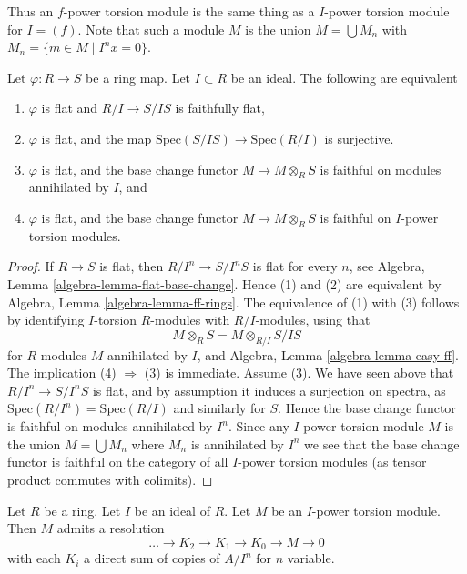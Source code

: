 \noindent
Thus an $f$-power torsion module is the same thing as a $I$-power torsion
module for $I = (f)$. Note that such a module $M$ is the union
$M = \bigcup M_n$ with $M_n = \{m \in M \mid I^nx = 0\}$.

\begin{lemma}
\label{lemma-characterize-flatness-on-torsion}
Let $\varphi : R \to S$ be a ring map. Let $I \subset R$ be an ideal.
The following are equivalent
\begin{enumerate}
\item $\varphi$ is flat and $R/I \to S/IS$ is faithfully flat,
\item $\varphi$ is flat, and the map
$\text{Spec}(S/IS) \to \text{Spec}(R/I)$ is surjective.
\item $\varphi$ is flat, and the base change functor
$M \mapsto M \otimes_R S$ is faithful on modules annihilated by $I$, and
\item $\varphi$ is flat, and the base change functor
$M \mapsto M \otimes_R S$ is faithful on $I$-power torsion modules.
\end{enumerate}
\end{lemma}

\begin{proof}
If $R \to S$ is flat, then $R/I^n \to S/I^nS$ is flat for every $n$, see
Algebra, Lemma \ref{algebra-lemma-flat-base-change}.
Hence (1) and (2) are equivalent by
Algebra, Lemma \ref{algebra-lemma-ff-rings}.
The equivalence of (1) with (3) follows by identifying $I$-torsion
$R$-modules with $R/I$-modules, using that
$$
M \otimes_R S = M \otimes_{R/I} S/IS
$$ 
for $R$-modules $M$ annihilated by $I$, and
Algebra, Lemma \ref{algebra-lemma-easy-ff}.
The implication (4) $\Rightarrow$ (3) is immediate. Assume (3). We have
seen above that $R/I^n \to S/I^nS$ is flat, and by assumption it induces
a surjection on spectra, as $\text{Spec}(R/I^n) = \text{Spec}(R/I)$ and
similarly for $S$. Hence the base change functor is faithful on modules
annihilated by $I^n$. Since any $I$-power torsion module $M$ is the union
$M = \bigcup M_n$ where $M_n$ is annihilated by $I^n$ we see that the base
change functor is faithful on the category of all $I$-power torsion modules
(as tensor product commutes with colimits).
\end{proof}

\begin{lemma}
\label{lemma-I-power-torsion-presentation}
Let $R$ be a ring.
Let $I$ be an ideal of $R$.
Let $M$ be an $I$-power torsion module.
Then $M$ admits a resolution
$$
\ldots \to K_2 \to K_1 \to K_0 \to M \to 0
$$
with each $K_i$ a direct sum of copies of $A/I^n$ for $n$ variable.
\end{lemma}

